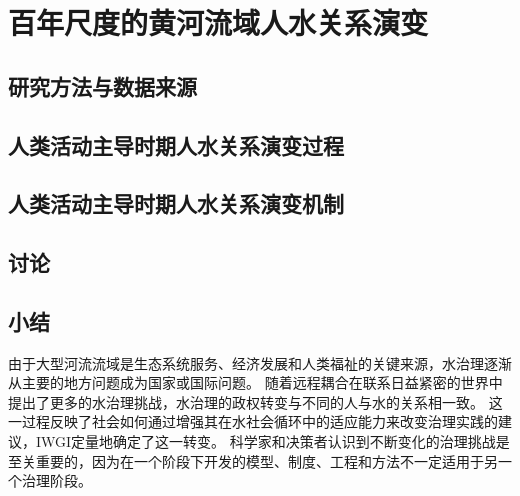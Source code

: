 \chapter{百年尺度的黄河流域人水关系演变}\label{cha:4}


\section{研究方法与数据来源}\label{ch4:methods}


\section{人类活动主导时期人水关系演变过程}\label{ch4:process}


\section{人类活动主导时期人水关系演变机制}\label{ch4:mechanism}


\section{讨论}\label{ch4:discussion}


\section{小结}\label{ch4:summary}
% 
由于大型河流流域是生态系统服务、经济发展和人类福祉的关键来源，水治理逐渐从主要的地方问题成为国家或国际问题\cite{best2019,best2020}。
随着远程耦合在联系日益紧密的世界中提出了更多的水治理挑战，水治理的政权转变与不同的人与水的关系相一致\cite{diaz2019}。
这一过程反映了社会如何通过增强其在水社会循环中的适应能力来改变治理实践的建议，IWGI定量地确定了这一转变\cite{loch2020,turton1999}。
科学家和决策者认识到不断变化的治理挑战是至关重要的，因为在一个阶段下开发的模型、制度、工程和方法不一定适用于另一个治理阶段\cite{reyers2018}。

